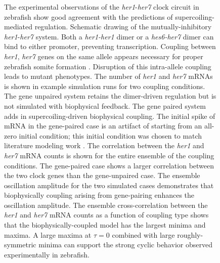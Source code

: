 \documentclass[11pt]{article}
\begin{document}
\begin{figure}[htbp]
    \ContinuedFloat
    \caption{The experimental observations of the \textit{her1}-\textit{her7} clock circuit in zebrafish\parencite{zinaniPairingSegmentationClock2021} show good agreement with the predictions of supercoiling-mediated regulation.
         Schematic drawing of the mutually-inhibitory \textit{her1}-\textit{her7} system. Both a \textit{her1-her1} dimer or a \textit{hes6-her7} dimer can bind to either promoter, preventing transcription.
         Coupling between \textit{her1}, \textit{her7} genes on the same allele appears necessary for proper zebrafish somite formation \parencite{zinaniPairingSegmentationClock2021}. Disruption of this intra-allele coupling leads to mutant phenotypes.
         The number of \textit{her1} and \textit{her7} mRNAs is shown in example simulation runs for two coupling conditions. The gene unpaired system retains the dimer-driven regulation but is not simulated with biophysical feedback. The gene paired system adds in supercoiling-driven biophysical coupling. The initial spike of mRNA in the gene-paired case is an artifact of starting from an all-zero initial condition; this initial condition was chosen to match literature modeling work \parencite{zinaniPairingSegmentationClock2021}.
         The correlation between the \textit{her1} and \textit{her7} mRNA counts is shown for the entire ensemble of the coupling conditions. The gene-paired case shows a larger correlation between the two clock genes than the gene-unpaired case.
         The ensemble oscillation amplitude for the two simulated cases demonstrates that biophysically coupling arising from gene-pairing enhances the oscillation amplitude.
         The ensemble cross-correlation between the \textit{her1} and \textit{her7} mRNA counts as a function of coupling type shows that the biophysically-coupled model has the largest minima and maxima. A large maxima at \(\tau = 0\) combined with large roughly-symmetric minima can support the strong cyclic behavior observed experimentally in zebrafish. %
    } \label{fig:top:her1_her7}
\end{figure}
\end{document}
